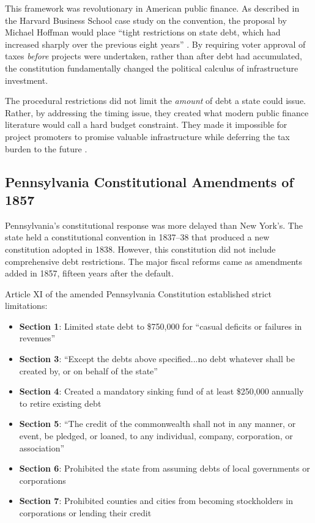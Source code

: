 \documentclass[12pt]{article}
\begin{document}
This framework was revolutionary in American public finance. As described in the Harvard Business School case study on the convention, the proposal by Michael Hoffman would place ``tight restrictions on state debt, which had increased sharply over the previous eight years'' \citep{moss2016debt}. By requiring voter approval of taxes \emph{before} projects were undertaken, rather than after debt had accumulated, the constitution fundamentally changed the political calculus of infrastructure investment.

The procedural restrictions did not limit the \emph{amount} of debt a state could issue. Rather, by addressing the timing issue, they created what modern public finance literature would call a hard budget constraint. They made it impossible for project promoters to promise valuable infrastructure while deferring the tax burden to the future \citep{grinath1997debt}.

\subsection{Pennsylvania Constitutional Amendments of 1857}

Pennsylvania's constitutional response was more delayed than New York's. The state held a constitutional convention in 1837--38 that produced a new constitution adopted in 1838. However, this constitution did not include comprehensive debt restrictions. The major fiscal reforms came as amendments added in 1857, fifteen years after the default.

Article XI of the amended Pennsylvania Constitution established strict limitations:

\begin{itemize}
\item \textbf{Section 1}: Limited state debt to \$750,000 for ``casual deficits or failures in revenues''
\item \textbf{Section 3}: ``Except the debts above specified...no debt whatever shall be created by, or on behalf of the state''
\item \textbf{Section 4}: Created a mandatory sinking fund of at least \$250,000 annually to retire existing debt
\item \textbf{Section 5}: ``The credit of the commonwealth shall not in any manner, or event, be pledged, or loaned, to any individual, company, corporation, or association''
\item \textbf{Section 6}: Prohibited the state from assuming debts of local governments or corporations
\item \textbf{Section 7}: Prohibited counties and cities from becoming stockholders in corporations or lending their credit
\end{itemize}
\end{document}
